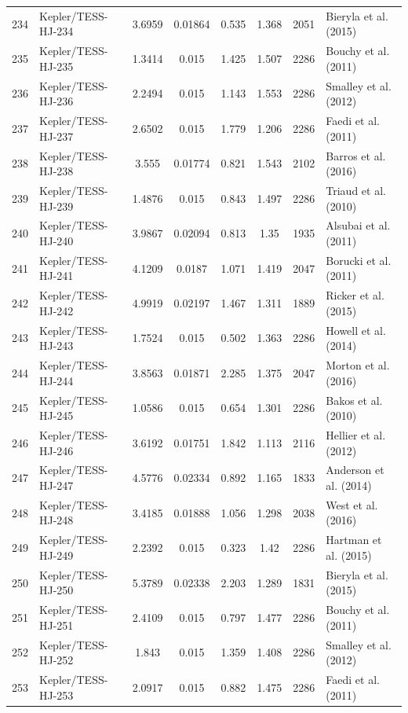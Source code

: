 \begin{longtable}{r l c c c c c p{4.2cm}}
234 & Kepler/TESS-HJ-234 & 3.6959 & 0.01864 & 0.535 & 1.368 & 2051 & Bieryla et al. (2015) \\
235 & Kepler/TESS-HJ-235 & 1.3414 & 0.015 & 1.425 & 1.507 & 2286 & Bouchy et al. (2011) \\
236 & Kepler/TESS-HJ-236 & 2.2494 & 0.015 & 1.143 & 1.553 & 2286 & Smalley et al. (2012) \\
237 & Kepler/TESS-HJ-237 & 2.6502 & 0.015 & 1.779 & 1.206 & 2286 & Faedi et al. (2011) \\
238 & Kepler/TESS-HJ-238 & 3.555 & 0.01774 & 0.821 & 1.543 & 2102 & Barros et al. (2016) \\
239 & Kepler/TESS-HJ-239 & 1.4876 & 0.015 & 0.843 & 1.497 & 2286 & Triaud et al. (2010) \\
240 & Kepler/TESS-HJ-240 & 3.9867 & 0.02094 & 0.813 & 1.35 & 1935 & Alsubai et al. (2011) \\
241 & Kepler/TESS-HJ-241 & 4.1209 & 0.0187 & 1.071 & 1.419 & 2047 & Borucki et al. (2011) \\
242 & Kepler/TESS-HJ-242 & 4.9919 & 0.02197 & 1.467 & 1.311 & 1889 & Ricker et al. (2015) \\
243 & Kepler/TESS-HJ-243 & 1.7524 & 0.015 & 0.502 & 1.363 & 2286 & Howell et al. (2014) \\
244 & Kepler/TESS-HJ-244 & 3.8563 & 0.01871 & 2.285 & 1.375 & 2047 & Morton et al. (2016) \\
245 & Kepler/TESS-HJ-245 & 1.0586 & 0.015 & 0.654 & 1.301 & 2286 & Bakos et al. (2010) \\
246 & Kepler/TESS-HJ-246 & 3.6192 & 0.01751 & 1.842 & 1.113 & 2116 & Hellier et al. (2012) \\
247 & Kepler/TESS-HJ-247 & 4.5776 & 0.02334 & 0.892 & 1.165 & 1833 & Anderson et al. (2014) \\
248 & Kepler/TESS-HJ-248 & 3.4185 & 0.01888 & 1.056 & 1.298 & 2038 & West et al. (2016) \\
249 & Kepler/TESS-HJ-249 & 2.2392 & 0.015 & 0.323 & 1.42 & 2286 & Hartman et al. (2015) \\
250 & Kepler/TESS-HJ-250 & 5.3789 & 0.02338 & 2.203 & 1.289 & 1831 & Bieryla et al. (2015) \\
251 & Kepler/TESS-HJ-251 & 2.4109 & 0.015 & 0.797 & 1.477 & 2286 & Bouchy et al. (2011) \\
252 & Kepler/TESS-HJ-252 & 1.843 & 0.015 & 1.359 & 1.408 & 2286 & Smalley et al. (2012) \\
253 & Kepler/TESS-HJ-253 & 2.0917 & 0.015 & 0.882 & 1.475 & 2286 & Faedi et al. (2011) \\

\end{longtable}
